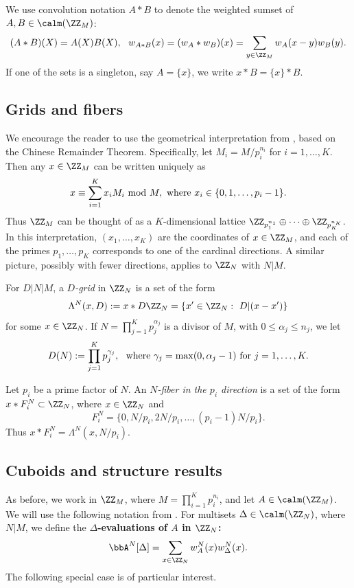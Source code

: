 We use convolution notation $A*B$ to denote the weighted sumset of $A,B\in\calm(\ZZ_M)$:
 $$
 (A*B)(X)=A(X)B(X),\ \ 
 w_{A*B}(x)=(w_A*w_B)(x)=\sum_{y\in\ZZ_M} w_A(x-y)w_B(y).$$
 If one of the sets is a singleton, say $A=\{x\}$, we write $x*B=\{x\}*B$.  

\subsection{Grids and fibers}\label{grids-fibers}
We encourage the reader to use the geometrical interpretation from \cite{LaLo1}, based on the Chinese Remainder Theorem. Specifically, let $M_i=M/p_i^{n_i}$ for $i=1,\dots,K$. Then any $x\in\ZZ_M$ can be written uniquely as 
$$
x\equiv \sum_{i=1}^{K} x_iM_i\hbox{ mod }M,\hbox{ where }x_i\in\{0,1,\dots,p_i-1\}.
$$
Thus $\ZZ_M$ can be thought of as a $K$-dimensional lattice $\ZZ_{p_1^{n_1}}\oplus\dots\oplus \ZZ_{p_K^{n_K}}$. In this interpretation, $(x_1,\dots,x_K)$ are the coordinates of $x\in\ZZ_M$, and each of the primes $p_1,\dots,p_K$ corresponds to one of the cardinal directions. A similar picture, possibly with fewer directions, applies to $\ZZ_N$ with $N|M$. 

For $D|N|M$, a {\em $D$-grid} in $\ZZ_N$ is a set of the form
$$
\Lambda^N(x,D):= x*D\ZZ_N=\{x'\in\ZZ_N:\ D|(x-x')\}
$$
for some $x\in\ZZ_N$.  
If $N=\prod_{j=1}^K p_j^{\alpha_j}$ is a divisor of $M$, with  $0\leq \alpha_j\leq n_j$, we let 
$$
D(N):= \prod_{j=1}^K p_j^{\gamma_j},\ \hbox{ where }
\gamma_j=\max(0,\alpha_j-1)\hbox{ for }j=1,\dots,K.
$$  


Let $p_i$ be a prime factor of $N$. An {\em $N$-fiber in the $p_i$ direction} is a set of the form $x*F^N_i\subset\ZZ_N$, where $x\in\ZZ_N$ and
\begin{equation}\label{def-Fi}
F^N_i=\{0,N/p_i,2N/p_i,\dots,(p_i-1)N/p_i\}.
\end{equation}
Thus $x*F^N_i=\Lambda^N(x,N/p_i)$. 





%

\subsection{Cuboids and structure results}
As before, we work in $\ZZ_M$, where $M=\prod_{i=1}^K p_i^{n_i}$, and let $A\in\calm(\ZZ_M)$.
We will use the following notation from \cite{LaLo1}. For multisets $\Delta\in\calm(\ZZ_N)$, where $N|M$, we define the \textbf{$\Delta$-evaluations of $A$ in $\ZZ_N$:}
\begin{equation}\label{delta-eval}
\bbA^N[\Delta]=\sum_{x\in\ZZ_N}w_A^N(x)w_\Delta^N(x).
\end{equation}
The following special case is of particular interest.

